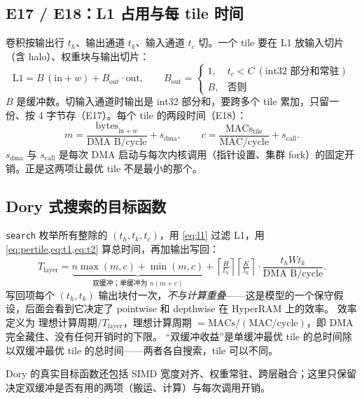 \documentclass[11pt,a4paper]{ctexart}
\begin{document}
\subsection{E17 / E18：L1 占用与每 tile 时间}

卷积按输出行 $t_h$、输出通道 $t_k$、输入通道 $t_c$ 切。一个 tile 要在 L1 放输入切片（含 halo）、权重块与输出切片：
\begin{equation}
\text{L1} = B\,(\text{in} + w) + B_{\text{out}}\cdot\text{out}, \qquad
B_{\text{out}} = \begin{cases} 1, & t_c < C\ (\text{int32 部分和常驻}) \\ B, & \text{否则} \end{cases} \label{eq:l1}
\end{equation}
$B$ 是缓冲数。切输入通道时输出是 int32 部分和，要跨多个 tile 累加，只留一份、按 4 字节存（E17）。每个 tile 的两段时间（E18）：
\begin{equation}
m = \frac{\text{bytes}_{\text{in}+w}}{\text{DMA B/cycle}} + s_{\text{dma}}, \qquad
c = \frac{\text{MACs}_{\text{tile}}}{\text{MAC/cycle}} + s_{\text{call}}. \label{eq:pertile}
\end{equation}
$s_{\text{dma}}$ 与 $s_{\text{call}}$ 是每次 DMA 启动与每次内核调用（指针设置、集群 fork）的固定开销。正是这两项让最优 tile 不是最小的那个。

\subsection{Dory 式搜索的目标函数}

\texttt{search} 枚举所有整除的 $(t_h, t_k, t_c)$，用 \cref{eq:l1} 过滤 L1，用 \cref{eq:pertile,eq:t1,eq:t2} 算总时间，再加输出写回：
\begin{equation}
T_{\text{layer}} = \underbrace{n\max(m,c)+\min(m,c)}_{\text{双缓冲；单缓冲为 } n(m+c)}
 + \left\lceil \tfrac{H}{t_h}\right\rceil\left\lceil \tfrac{K}{t_k}\right\rceil \cdot \frac{t_h W t_k}{\text{DMA B/cycle}}. \label{eq:dory}
\end{equation}
写回项每个 $(t_h, t_k)$ 输出块付一次，\emph{不与计算重叠}——这是模型的一个保守假设，后面会看到它决定了 pointwise 和 depthwise 在 HyperRAM 上的效率。
效率定义为 $\text{理想计算周期}/T_{\text{layer}}$，理想计算周期 $=\text{MACs}/(\text{MAC/cycle})$，即 DMA 完全藏住、没有任何开销时的下限。
“双缓冲收益”是单缓冲最优 tile 的总时间除以双缓冲最优 tile 的总时间——两者各自搜索，tile 可以不同。

Dory 的真实目标函数还包括 SIMD 宽度对齐、权重常驻、跨层融合；这里只保留决定双缓冲是否有用的两项（搬运、计算）与每次调用开销。
\end{document}
